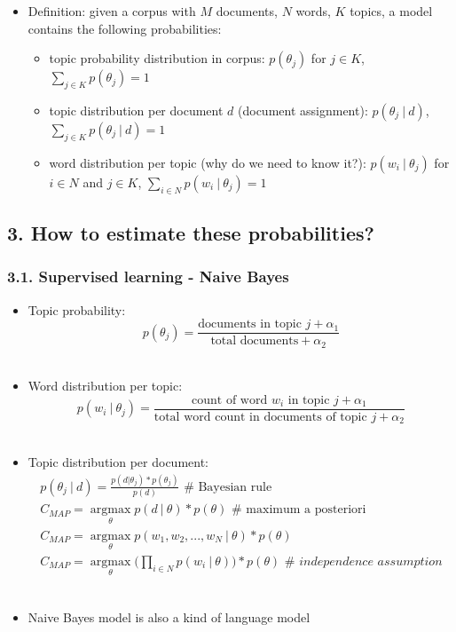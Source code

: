 \documentclass[11pt]{article}
\providecommand{\tightlist}{%
      \setlength{\itemsep}{0pt}\setlength{\parskip}{0pt}}
\begin{document}
\begin{itemize}
\tightlist
\item
  Definition: given a corpus with \(M\) documents, \(N\) words, \(K\)
  topics, a model contains the following probabilities:

  \begin{itemize}
  \tightlist
  \item
    topic probability distribution in corpus: \(p(\theta_j)\) for
    \(j \in K\), \(\sum_{j\in K}{p(\theta_j)}=1\)
  \item
    topic distribution per document \(d\) (document assignment):
    \(p(\theta_j~|~d)\), \(\sum_{j\in K}{p(\theta_j~|~d)}=1\)
  \item
    word distribution per topic (why do we need to know it?):
    \(p(w_i~|~\theta_j)\) for \(i \in N\) and \(j\in K\),
    \(\sum_{i\in N}{p(w_i~|~\theta_j)}=1\) 
  \end{itemize}
\end{itemize}

    \hypertarget{how-to-estimate-these-probabilities}{%
\subsection{3. How to estimate these
probabilities?}\label{how-to-estimate-these-probabilities}}

\hypertarget{supervised-learning---naive-bayes}{%
\subsubsection{3.1. Supervised learning - Naive
Bayes}\label{supervised-learning---naive-bayes}}

\begin{itemize}
\tightlist
\item
  Topic probability:
  \[ p(\theta_j) = \frac{\text{documents in topic } j + \alpha_1} {\text{total documents}+\alpha_2}\]\\
\item
  Word distribution per topic:
  \[ p(w_i~|~\theta_j)= \frac{\text{count of word } w_i \text{ in topic } j + \alpha_1} {\text{total word count in documents of topic }j + \alpha_2}\]\\
\item
  Topic distribution per document: \[ \begin{array}{l}
   p(\theta_j~|~d) = \frac{p(d|\theta_j) * p(\theta_j)}{p(d)} \text{         # Bayesian rule}\\
   C_{MAP} = \underset{\theta}{\operatorname{argmax}}{p(d~|~\theta)*p(\theta)} \text{         # maximum a posteriori}\\
    C_{MAP} = \underset{\theta}{\operatorname{argmax}}{p(w_1,w_2, ...,w_N~|~\theta)*p(\theta)} \\
    C_{MAP} = \underset{\theta}{\operatorname{argmax}}({\prod_{i \in N} {p(w_i~|~\theta)})*p(\theta)}  \textit{ # independence assumption}
  \end{array}\]\\
\item
  Naive Bayes model is also a kind of language model
\end{itemize}
\end{document}
